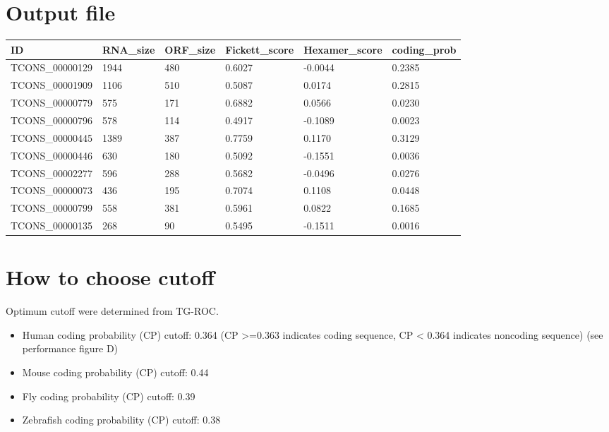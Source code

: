 \documentclass[letterpaper,10pt,english]{sphinxmanual}
\begin{document}
\section{Output file}
\label{index:output-file}
\begin{tabulary}{\linewidth}{|L|L|L|L|L|L|}
\hline
\textsf{\relax 
ID
} & \textsf{\relax 
RNA\_size
} & \textsf{\relax 
ORF\_size
} & \textsf{\relax 
Fickett\_score
} & \textsf{\relax 
Hexamer\_score
} & \textsf{\relax 
coding\_prob
}\\
\hline
TCONS\_00000129
 & 
1944
 & 
480
 & 
0.6027
 & 
-0.0044
 & 
0.2385
\\

TCONS\_00001909
 & 
1106
 & 
510
 & 
0.5087
 & 
0.0174
 & 
0.2815
\\

TCONS\_00000779
 & 
575
 & 
171
 & 
0.6882
 & 
0.0566
 & 
0.0230
\\

TCONS\_00000796
 & 
578
 & 
114
 & 
0.4917
 & 
-0.1089
 & 
0.0023
\\

TCONS\_00000445
 & 
1389
 & 
387
 & 
0.7759
 & 
0.1170
 & 
0.3129
\\

TCONS\_00000446
 & 
630
 & 
180
 & 
0.5092
 & 
-0.1551
 & 
0.0036
\\

TCONS\_00002277
 & 
596
 & 
288
 & 
0.5682
 & 
-0.0496
 & 
0.0276
\\

TCONS\_00000073
 & 
436
 & 
195
 & 
0.7074
 & 
0.1108
 & 
0.0448
\\

TCONS\_00000799
 & 
558
 & 
381
 & 
0.5961
 & 
0.0822
 & 
0.1685
\\

TCONS\_00000135
 & 
268
 & 
90
 & 
0.5495
 & 
-0.1511
 & 
0.0016
\\
\hline\end{tabulary}



\section{How to choose cutoff}
\label{index:how-to-choose-cutoff}
Optimum cutoff were determined from TG-ROC.
\begin{itemize}
\item {} 
Human coding probability (CP) cutoff: 0.364 (CP \textgreater{}=0.363 indicates coding sequence, CP \textless{} 0.364 indicates noncoding sequence) (see performance figure D)

\item {} 
Mouse coding probability (CP) cutoff: 0.44

\item {} 
Fly coding probability (CP) cutoff: 0.39

\item {} 
Zebrafish coding probability (CP) cutoff: 0.38

\end{itemize}
\end{document}
